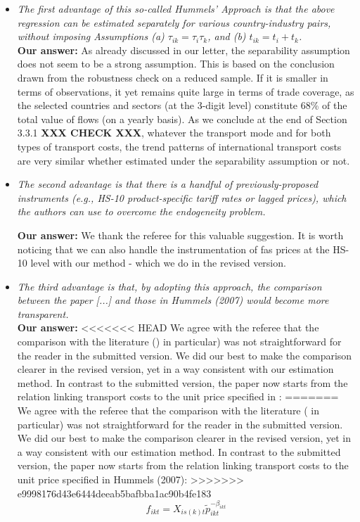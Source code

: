 \documentclass[a4paper,11pt]{article}
\begin{document}
\begin{itemize}
\item \textit{The first advantage of this so-called Hummels' Approach is that the above
regression can be estimated separately for various country-industry pairs, without
imposing Assumptions (a) $\tau_{ik} = \tau_i\tau_{k}$, and (b) $t_{ik} = t_i+ t_{k}$.} \\

\textbf{Our answer:}
As already discussed in our letter, the separability assumption does not seem to be a strong assumption. This is based on the conclusion drawn from the robustness check on a reduced sample. If it is smaller in terms of observations, it yet remains quite large in terms of trade coverage, as the selected countries and sectors (at the 3-digit level) constitute 68\% of the total value of flows (on a yearly basis). As we conclude at the end of Section 3.3.1 \textbf{XXX CHECK XXX}, whatever the transport mode and for both types of transport costs, the trend patterns of international transport costs are very similar whether estimated under the separability assumption or not.

\item \textit{The second advantage is that there is a handful of previously-proposed instruments (e.g., HS-10 product-specific tariff rates or lagged prices), which the authors can use to overcome the endogeneity problem.}

     \textbf{Our answer:}
We thank the referee for this valuable suggestion. It is worth noticing that we can also handle the instrumentation of fas prices at the HS-10 level with our method - which we do in the revised version.


\item  \textit{The third advantage is that, by adopting this approach, the comparison between the paper [...] and those in Hummels (2007) would become more transparent.}\\
     \textbf{Our answer:}
<<<<<<< HEAD
     We agree with the referee that the comparison with the literature (\citealp{hummels2007}) in particular) was not straightforward for the reader in the submitted version. We did our best to make the comparison clearer in the revised version, yet in a way consistent with our estimation method. In contrast to the submitted version, the paper now starts from the relation linking transport costs to the unit price specified in \citet{hummels2007}:
=======
     We agree with the referee that the comparison with the literature (\citealp{hummels2007} in particular) was not straightforward for the reader in the submitted version. We did our best to make the comparison clearer in the revised version, yet in a way consistent with our estimation method. In contrast to the submitted version, the paper now starts from the relation linking transport costs to the unit price specified in Hummels (2007):
>>>>>>> e9998176d43e6444deeab5bafbba1ac90b4fe183
    \begin{equation}
    f_{ikt} = X_{is(k)t}\widetilde{p}_{ikt}^{-\beta_{ikt}} \label{eq:Hummels}
    \end{equation}


\end{itemize}
\end{document}
